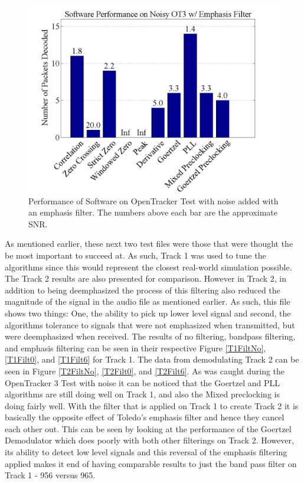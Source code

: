 \begin{figure}
  \centering
	\includegraphics[width=0.75\linewidth]{images/SoftwarePerformanceonNoisyOT3wEmphasisFilter.png} 
	\caption[Performance of Software on OpenTracker Test with noise added with an emphasis filter.]{Performance of Software on OpenTracker Test with noise added with an emphasis filter. The numbers above each bar are the approximate SNR.}
   \label{OTNoiseFilt6}
\end{figure}

As mentioned earlier, these next two test files were those that were thought the be most important to succeed at. As such, Track 1 was used to tune the algorithms since this would represent the closest real-world simulation possible. The Track 2 results are also presented for comparison. However in Track 2, in addition to being deemphasized the process of this filtering also reduced the magnitude of the signal in the audio file as mentioned earlier. As such, this file shows two things: One, the ability to pick up lower level signal and second, the algorithms tolerance to signals that were not emphasized when transmitted, but were deemphasized when received. The results of no filtering, bandpass filtering, and emphasis filtering can be seen in their respective Figure \ref{T1FiltNo}, \ref{T1Filt0}, and \ref{T1Filt6} for Track 1. The data from demodulating Track 2 can be seen in Figure \ref{T2FiltNo}, \ref{T2Filt0}, and \ref{T2Filt6}. As was caught during the OpenTracker 3 Test with noise it can be noticed that the Goertzel and PLL algorithms are still doing well on Track 1, and also the Mixed preclocking is doing fairly well. With the filter that is applied on Track 1 to create Track 2 it is basically the opposite effect of Toledo's emphasis filter and hence they cancel each other out. This can be seen by looking at the performance of the Goertzel Demodulator which does poorly with both other filterings on Track 2. However, its ability to detect low level signals and this reversal of the emphasis filtering applied makes it end of having comparable results to just the band pass filter on Track 1 - 956 versus 965. 

